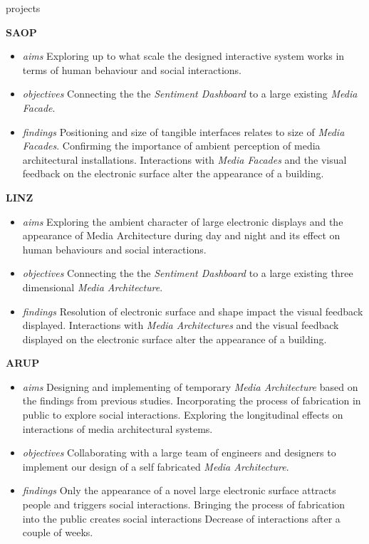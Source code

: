 \begin{singlespace}
{\begin{labeling}{projects}
\item [\textbf{SAOP}]
\begin {itemize}
\footnotesize
\item [\textit{aims}] Exploring up to what scale the designed interactive system works in terms of human behaviour and social interactions.
\item [\textit{objectives}] Connecting the the \textit{Sentiment Dashboard} to a large existing \textit{Media Facade}. 
\item [\textit{findings}] Positioning and size of tangible interfaces relates to size of \textit{Media Facades}. \newline Confirming the importance of ambient perception of media architectural installations. \newline Interactions with \textit{Media Facades} and the visual feedback on the electronic surface alter the appearance of a building.
\end{itemize}
 
\item [\textbf{LINZ}] 
\begin {itemize}
\footnotesize
\item [\textit{aims}] Exploring the ambient character of large electronic displays and the appearance of Media Architecture during day and night and its effect on human behaviours and social interactions.  
\item [\textit{objectives}]Connecting the the \textit{Sentiment Dashboard} to a large existing three dimensional \textit{Media Architecture}.
\item [\textit{findings}] Resolution of electronic surface and shape impact the visual feedback displayed. \newline Interactions with \textit{Media Architectures} and the visual feedback displayed on the electronic surface alter the appearance of a building.
\end{itemize}

\item [\textbf{ARUP}]
\begin {itemize}
\footnotesize
\item [\textit{aims}] Designing and implementing of temporary \textit{Media Architecture} based on the findings from previous studies.  \newline Incorporating the process of fabrication in public to explore social interactions. \newline Exploring the longitudinal effects on interactions of media architectural systems.
\item [\textit{objectives}] Collaborating with a large team of engineers and designers to implement our design of a self fabricated \textit{Media Architecture}.
\item [\textit{findings}] Only the appearance of a novel large electronic surface attracts people and triggers social interactions. \newline Bringing the process of fabrication into the public creates social interactions \newline Decrease of interactions after a couple of weeks.
\end{itemize}


\end{labeling}}
\end{singlespace}
